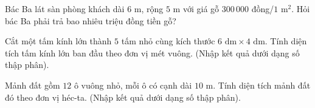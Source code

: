 \begin{ex} %
Bác Ba lát sàn phòng khách dài $6\text{ m}$, rộng $5\text{ m}$ với giá gỗ $300\,000$ đồng/$1\text{ m}^2$. Hỏi bác Ba phải trả bao nhiêu triệu đồng tiền gỗ?
\end{ex}

\begin{ex} %
Cắt một tấm kính lớn thành $5$ tấm nhỏ cùng kích thước $6\text{ dm} \times 4\text{ dm}$. Tính diện tích tấm kính lớn ban đầu theo đơn vị mét vuông. (Nhập kết quả dưới dạng số thập phân).
\end{ex}

\begin{ex} %
Mảnh đất gồm $12$ ô vuông nhỏ, mỗi ô có cạnh dài $10\text{ m}$. Tính diện tích mảnh đất đó theo đơn vị héc-ta. (Nhập kết quả dưới dạng số thập phân).
\end{ex}

